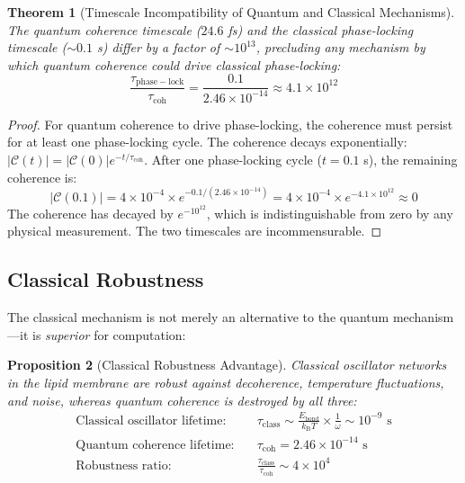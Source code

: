 \documentclass[twocolumn,10pt,a4paper]{article}
\newtheorem{theorem}{Theorem}[section]
\newtheorem{proposition}[theorem]{Proposition}
\theoremstyle{definition}
\theoremstyle{remark}
\newcommand{\kB}{k_{\mathrm{B}}}
\begin{document}
\begin{theorem}[Timescale Incompatibility of Quantum and Classical Mechanisms]
\label{thm:timescale}
The quantum coherence timescale ($24.6$ fs) and the classical phase-locking timescale ($\sim 0.1$ s) differ by a factor of $\sim 10^{13}$, precluding any mechanism by which quantum coherence could drive classical phase-locking:
\begin{equation}
\label{eq:timescale_ratio}
\frac{\tau_{\mathrm{phase-lock}}}{\tau_{\mathrm{coh}}} = \frac{0.1}{2.46 \times 10^{-14}} \approx 4.1 \times 10^{12}
\end{equation}
\end{theorem}

\begin{proof}
For quantum coherence to drive phase-locking, the coherence must persist for at least one phase-locking cycle. The coherence decays exponentially: $|\mathcal{C}(t)| = |\mathcal{C}(0)| e^{-t/\tau_{\mathrm{coh}}}$. After one phase-locking cycle ($t = 0.1$ s), the remaining coherence is:
\begin{equation}
|\mathcal{C}(0.1)| = 4 \times 10^{-4} \times e^{-0.1/(2.46 \times 10^{-14})} = 4 \times 10^{-4} \times e^{-4.1 \times 10^{12}} \approx 0
\end{equation}
The coherence has decayed by $e^{-10^{12}}$, which is indistinguishable from zero by any physical measurement. The two timescales are incommensurable. \qedhere
\end{proof}

\subsection{Classical Robustness}

The classical mechanism is not merely an alternative to the quantum mechanism---it is \emph{superior} for computation:

\begin{proposition}[Classical Robustness Advantage]
\label{prop:robustness}
Classical oscillator networks in the lipid membrane are robust against decoherence, temperature fluctuations, and noise, whereas quantum coherence is destroyed by all three:
\begin{align}
\text{Classical oscillator lifetime:} &\quad \tau_{\mathrm{class}} \sim \frac{E_{\mathrm{bond}}}{\kB T} \times \frac{1}{\omega} \sim 10^{-9} \text{ s} \label{eq:classical_lifetime} \\
\text{Quantum coherence lifetime:} &\quad \tau_{\mathrm{coh}} = 2.46 \times 10^{-14} \text{ s} \label{eq:quantum_lifetime} \\
\text{Robustness ratio:} &\quad \frac{\tau_{\mathrm{class}}}{\tau_{\mathrm{coh}}} \sim 4 \times 10^4 \label{eq:robustness_ratio}
\end{align}
\end{proposition}
\end{document}
